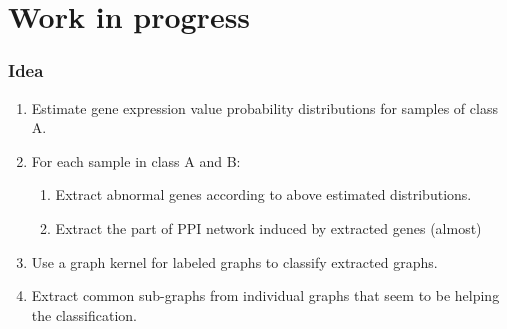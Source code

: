 \documentclass{beamer}
\begin{document}
\section{Work in progress}
\begin{frame}
  \frametitle{Idea}
  \begin{enumerate}
\footnotesize
  \item Estimate gene expression value probability distributions for samples of class A. \pause
  \item For each sample in class A and B:
    \begin{enumerate}
    \item Extract abnormal genes according to above estimated distributions.
    \item Extract the part of PPI network induced by extracted genes (almost)
    \end{enumerate}\pause
  \item Use a graph kernel for labeled graphs to classify extracted graphs. \pause
  \item Extract common sub-graphs from individual graphs that seem to be helping the classification. \pause
  \end{enumerate}
\end{frame}
\end{document}
